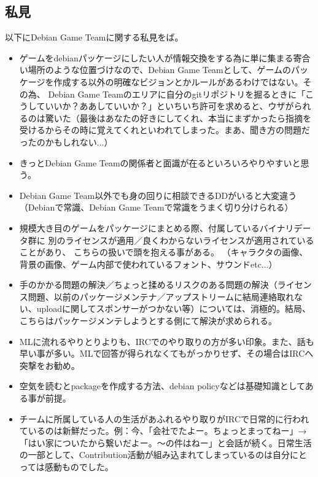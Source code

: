 \documentclass[mingoth,a4paper]{jsarticle}
\begin{document}
\subsection{私見}

 以下にDebian Game Teamに関する私見をば。

 \begin{itemize}
 \item ゲームをdebianパッケージにしたい人が情報交換をする為に単に集まる寄合い場所のような位置づけなので、Debian Game Teamとして、ゲームのパッケージを作成する以外の明確なビジョンとかルールがあるわけではない。その為、 Debian Game Teamのエリアに自分のgitリポジトリを掘るときに「こうしていいか？ああしていいか？」といちいち許可を求めると、ウザがられるのは驚いた（最後はあなたの好きにしてくれ、本当にまずかったら指摘を受けるからその時に覚えてくれといわれてしまった。まあ、聞き方の問題だったのかもしれない...）
   \item きっとDebian Game Teamの関係者と面識が在るといろいろやりやすいと思う。
   \item Debian Game Team以外でも身の回りに相談できるDDがいると大変違う（Debianで常識、Debian Game Teamで常識をうまく切り分けられる）
   \item 規模大き目のゲームをパッケージにまとめる際、付属しているバイナリデータ群に
        別のライセンスが適用／良くわからないライセンスが適用されていることがあり、
         こちらの扱いで頭を抱える事がある。
        （キャラクタの画像、背景の画像、ゲーム内部で使われているフォント、サウンドetc...）
   \item 手のかかる問題の解決／ちょっと揉めるリスクのある問題の解決（ライセンス問題、以前のパッケージメンテナ／アップストリームに結局連絡取れない、uploadに関してスポンサーがつかない等）については、消極的。結局、こちらはパッケージメンテしようとする側にて解決が求められる。
   \item MLに流れるやりとりよりも、IRCでのやり取りの方が多い印象。また、話も早い事が多い。MLで回答が得られなくてもがっかりせず、その場合はIRCへ突撃をお勧め。
   \item 空気を読むとpackageを作成する方法、debian policyなどは基礎知識としてある事が前提。
   \item チームに所属している人の生活があふれるやり取りがIRCで日常的に行われているのは新鮮だった。例：今、「会社でたよー。ちょっとまってねー」→ 「はい家についたから繋いだよー。〜の件はねー」と会話が続く。日常生活の一部として、Contribution活動が組み込まれてしまっているのは自分にとっては感動ものでした。
 \end{itemize}
\end{document}
